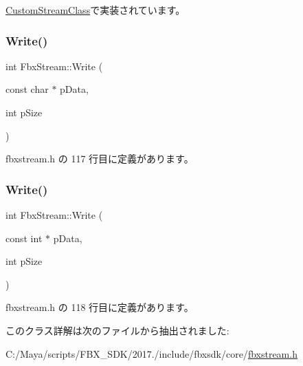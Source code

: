 \hyperlink{class_custom_stream_class_a952b5466395a669fb9f8458faf2f3046}{Custom\+Stream\+Class}で実装されています。

\mbox{\label{class_fbx_stream_a1506d750babeb4c981dc7aa4ce94d505}} 
\subsubsection{\texorpdfstring{Write()}{Write()}\hspace{0.1cm}{\footnotesize\ttfamily [2/3]}}
{\footnotesize\ttfamily int Fbx\+Stream\+::\+Write (\begin{DoxyParamCaption}\item[{const char $\ast$}]{p\+Data,  }\item[{int}]{p\+Size }\end{DoxyParamCaption})\hspace{0.3cm}{\ttfamily [inline]}}



 fbxstream.\+h の 117 行目に定義があります。

\mbox{\label{class_fbx_stream_aef3f0bcab29775b9deffb0142a399891}} 
\subsubsection{\texorpdfstring{Write()}{Write()}\hspace{0.1cm}{\footnotesize\ttfamily [3/3]}}
{\footnotesize\ttfamily int Fbx\+Stream\+::\+Write (\begin{DoxyParamCaption}\item[{const int $\ast$}]{p\+Data,  }\item[{int}]{p\+Size }\end{DoxyParamCaption})\hspace{0.3cm}{\ttfamily [inline]}}



 fbxstream.\+h の 118 行目に定義があります。



このクラス詳解は次のファイルから抽出されました\+:\begin{DoxyCompactItemize}
\item 
C\+:/\+Maya/scripts/\+F\+B\+X\+\_\+\+S\+D\+K/2017./include/fbxsdk/core/\hyperlink{fbxstream_8h}{fbxstream.\+h}\end{DoxyCompactItemize}
